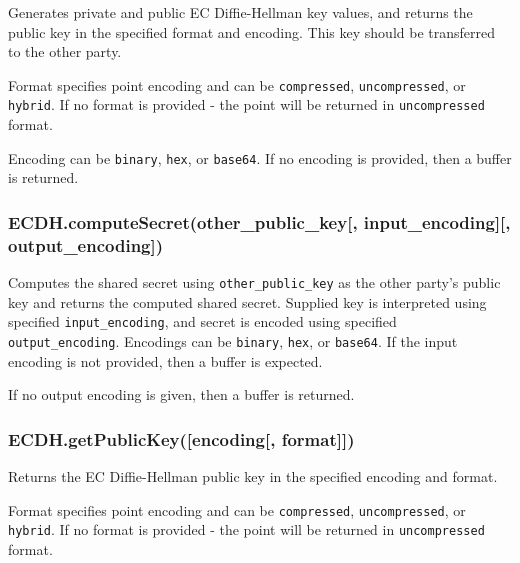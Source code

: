 Generates private and public EC Diffie-Hellman key values, and returns
the public key in the specified format and encoding. This key should be
transferred to the other party.

Format specifies point encoding and can be
\texttt{\textquotesingle{}compressed\textquotesingle{}},
\texttt{\textquotesingle{}uncompressed\textquotesingle{}}, or
\texttt{\textquotesingle{}hybrid\textquotesingle{}}. If no format is
provided - the point will be returned in
\texttt{\textquotesingle{}uncompressed\textquotesingle{}} format.

Encoding can be \texttt{\textquotesingle{}binary\textquotesingle{}},
\texttt{\textquotesingle{}hex\textquotesingle{}}, or
\texttt{\textquotesingle{}base64\textquotesingle{}}. If no encoding is
provided, then a buffer is returned.

\subsubsection{ECDH.computeSecret(other\_public\_key{[},
input\_encoding{]}{[},
output\_encoding{]})}\label{ecdh.computesecretotherux5fpublicux5fkey-inputux5fencoding-outputux5fencoding}

Computes the shared secret using \texttt{other\_public\_key} as the
other party's public key and returns the computed shared secret.
Supplied key is interpreted using specified \texttt{input\_encoding},
and secret is encoded using specified \texttt{output\_encoding}.
Encodings can be \texttt{\textquotesingle{}binary\textquotesingle{}},
\texttt{\textquotesingle{}hex\textquotesingle{}}, or
\texttt{\textquotesingle{}base64\textquotesingle{}}. If the input
encoding is not provided, then a buffer is expected.

If no output encoding is given, then a buffer is returned.

\subsubsection{ECDH.getPublicKey({[}encoding{[},
format{]}{]})}\label{ecdh.getpublickeyencoding-format}

Returns the EC Diffie-Hellman public key in the specified encoding and
format.

Format specifies point encoding and can be
\texttt{\textquotesingle{}compressed\textquotesingle{}},
\texttt{\textquotesingle{}uncompressed\textquotesingle{}}, or
\texttt{\textquotesingle{}hybrid\textquotesingle{}}. If no format is
provided - the point will be returned in
\texttt{\textquotesingle{}uncompressed\textquotesingle{}} format.

